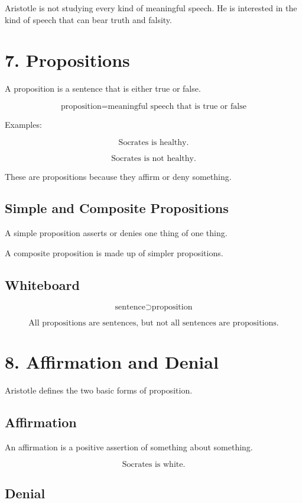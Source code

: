 \documentclass[12pt]{article}
\begin{document}
Aristotle is not studying every kind of meaningful speech. He is interested in
the kind of speech that can bear truth and falsity.

\section*{7. Propositions}

A proposition is a sentence that is either true or false.

\[
\boxed{
\text{proposition} = \text{meaningful speech that is true or false}
}
\]

Examples:

\[
\text{Socrates is healthy.}
\]

\[
\text{Socrates is not healthy.}
\]

These are propositions because they affirm or deny something.

\subsection*{Simple and Composite Propositions}

A simple proposition asserts or denies one thing of one thing.

A composite proposition is made up of simpler propositions.

\subsection*{Whiteboard}

\[
\text{sentence} \supset \text{proposition}
\]

\[
\text{All propositions are sentences, but not all sentences are propositions.}
\]

\section*{8. Affirmation and Denial}

Aristotle defines the two basic forms of proposition.

\subsection*{Affirmation}

An affirmation is a positive assertion of something about something.

\[
\text{Socrates is white.}
\]

\subsection*{Denial}
\end{document}
